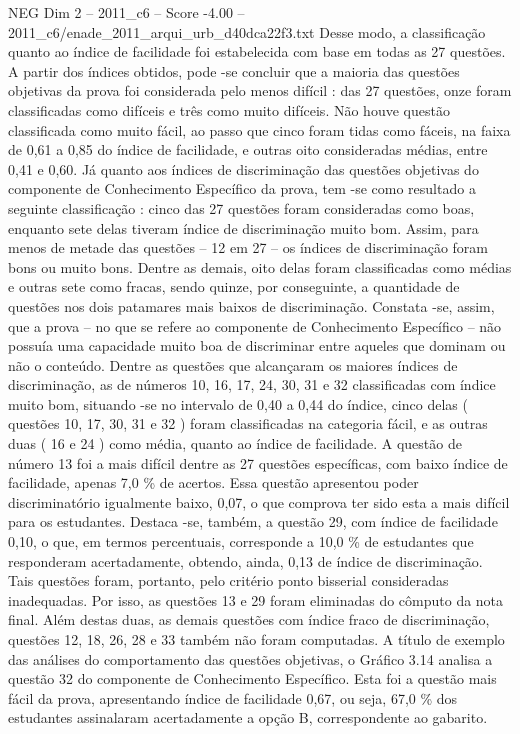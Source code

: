 \begin{textsample}{NEG Dim 2 – 2011\_c6 – Score -4.00 – 2011\_c6/enade\_2011\_arqui\_urb\_d40dca22f3.txt}
Desse modo, a classificação quanto ao índice de facilidade foi estabelecida com base em todas as 27 questões.
A partir dos índices obtidos, pode -se concluir que a maioria das questões objetivas da prova foi considerada pelo menos difícil : das 27 questões, onze foram classificadas como difíceis e três como muito difíceis.
Não houve questão classificada como muito fácil, ao passo que cinco foram tidas como fáceis, na faixa de 0,61 a 0,85 do índice de facilidade, e outras oito consideradas médias, entre 0,41 e 0,60.
Já quanto aos índices de discriminação das questões objetivas do componente de Conhecimento Específico da prova, tem -se como resultado a seguinte classificação : cinco das 27 questões foram consideradas como boas, enquanto sete delas tiveram índice de discriminação muito bom.
Assim, para menos de metade das questões – 12 em 27 – os índices de discriminação foram bons ou muito bons.
Dentre as demais, oito delas foram classificadas como médias e outras sete como fracas, sendo quinze, por conseguinte, a quantidade de questões nos dois patamares mais baixos de discriminação.
Constata -se, assim, que a prova – no que se refere ao componente de Conhecimento Específico – não possuía uma capacidade muito boa de discriminar entre aqueles que dominam ou não o conteúdo.
Dentre as questões que alcançaram os maiores índices de discriminação, as de números 10, 16, 17, 24, 30, 31 e 32 classificadas com índice muito bom, situando -se no intervalo de 0,40 a 0,44 do índice, cinco delas ( questões 10, 17, 30, 31 e 32 ) foram classificadas na categoria fácil, e as outras duas ( 16 e 24 ) como média, quanto ao índice de facilidade.
A questão de número 13 foi a mais difícil dentre as 27 questões específicas, com baixo índice de facilidade, apenas 7,0 \% de acertos.
Essa questão apresentou poder discriminatório igualmente baixo, 0,07, o que comprova ter sido esta a mais difícil para os estudantes.
Destaca -se, também, a questão 29, com índice de facilidade 0,10, o que, em termos percentuais, corresponde a 10,0 \% de estudantes que responderam acertadamente, obtendo, ainda, 0,13 de índice de discriminação.
Tais questões foram, portanto, pelo critério ponto bisserial consideradas inadequadas.
Por isso, as questões 13 e 29 foram eliminadas do cômputo da nota final.
Além destas duas, as demais questões com índice fraco de discriminação, questões 12, 18, 26, 28 e 33 também não foram computadas.
A título de exemplo das análises do comportamento das questões objetivas, o Gráfico 3.14 analisa a questão 32 do componente de Conhecimento Específico.
Esta foi a questão mais fácil da prova, apresentando índice de facilidade 0,67, ou seja, 67,0 \% dos estudantes assinalaram acertadamente a opção B, correspondente ao gabarito.

\end{textsample}

